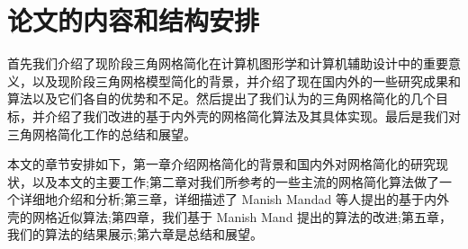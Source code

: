 \section{论文的内容和结构安排}
首先我们介绍了现阶段三角网格简化在计算机图形学和计算机辅助设计中的重要意义，以及现阶段三角网格模型简化的背景，并介绍了现在国内外的一些研究成果和算法以及它们各自的优势和不足。然后提出了我们认为的三角网格简化的几个目标，并介绍了我们改进的基于内外壳的网格简化算法及其具体实现。最后是我们对三角网格简化工作的总结和展望。\par
本文的章节安排如下，第一章介绍网格简化的背景和国内外对网格简化的研究现状，以及本文的主要工作;第二章对我们所参考的一些主流的网格简化算法做了一个详细地介绍和分析;第三章，详细描述了 Manish Mandad 等人提出的基于内外壳的网格近似算法;第四章，我们基于 Manish Mand 提出的算法的改进;第五章，我们的算法的结果展示;第六章是总结和展望。
